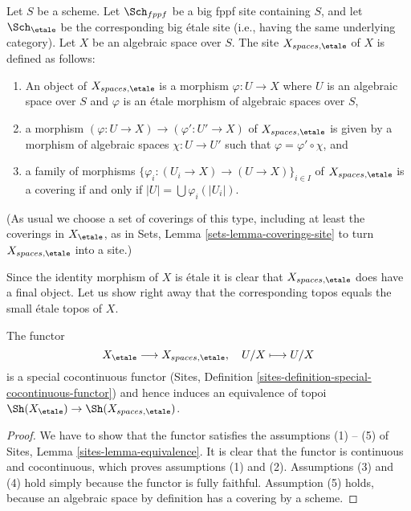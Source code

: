 \begin{definition}
\label{definition-spaces-etale-site}
Let $S$ be a scheme.
Let $\Sch_{fppf}$ be a big fppf site containing $S$,
and let $\Sch_\etale$ be the corresponding big \'etale site
(i.e., having the same underlying category).
Let $X$ be an algebraic space over $S$.
The site {\it $X_{spaces, \etale}$} of $X$ is defined as follows:
\begin{enumerate}
\item An object of $X_{spaces, \etale}$ is a morphism
$\varphi : U \to X$ where $U$ is an algebraic space over $S$ and
$\varphi$ is an \'etale morphism of algebraic spaces over $S$,
\item a morphism $(\varphi : U \to X) \to (\varphi' : U' \to X)$ of
$X_{spaces, \etale}$ is given by a morphism of algebraic spaces
$\chi : U \to U'$ such that $\varphi = \varphi' \circ \chi$, and
\item a family of morphisms
$\{\varphi_i : (U_i \to X) \to (U \to X)\}_{i \in I}$
of $X_{spaces, \etale}$ is a covering if and only if
$|U| = \bigcup \varphi_i(|U_i|)$.
\end{enumerate}
(As usual we choose a set of coverings of this type, including at least
the coverings in $X_\etale$, as in
Sets, Lemma \ref{sets-lemma-coverings-site}
to turn $X_{spaces, \etale}$ into a site.)
\end{definition}

\noindent
Since the identity morphism of $X$ is \'etale it is clear that
$X_{spaces, \etale}$ does have a final object.
Let us show right away that the corresponding topos equals the
small \'etale topos of $X$.

\begin{lemma}
\label{lemma-compare-etale-sites}
The functor
$$
X_\etale \longrightarrow X_{spaces, \etale}, \quad
U/X \longmapsto U/X
$$
is a special cocontinuous functor
(Sites, Definition \ref{sites-definition-special-cocontinuous-functor})
and hence induces an equivalence of topoi
$\Sh(X_\etale) \to \Sh(X_{spaces, \etale})$.
\end{lemma}

\begin{proof}
We have to show that the functor satisfies the assumptions (1) -- (5) of
Sites, Lemma \ref{sites-lemma-equivalence}.
It is clear that the functor is continuous and cocontinuous, which
proves assumptions (1) and (2).
Assumptions (3) and (4) hold simply because the functor is fully faithful.
Assumption (5) holds, because an algebraic space by definition has
a covering by a scheme.
\end{proof}

